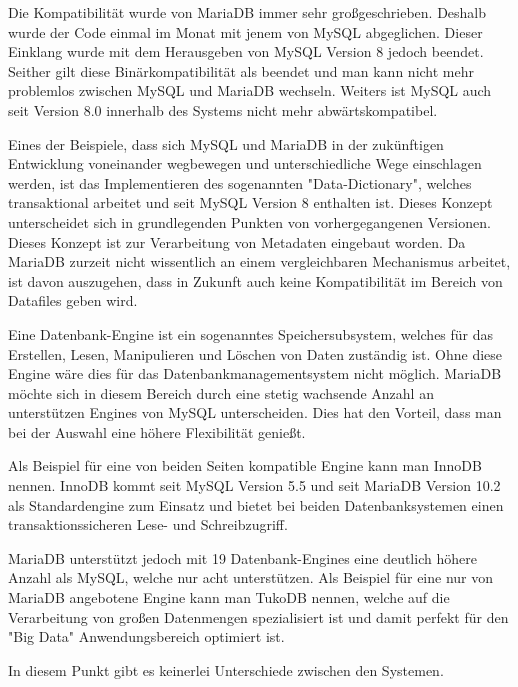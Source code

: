 Die Kompatibilität wurde von MariaDB immer sehr großgeschrieben. Deshalb wurde der Code einmal im Monat mit jenem von MySQL abgeglichen. Dieser Einklang wurde mit dem Herausgeben von MySQL Version 8 jedoch beendet. Seither gilt diese Binärkompatibilität als beendet und man kann nicht mehr problemlos zwischen MySQL und MariaDB wechseln. Weiters ist MySQL auch seit Version 8.0 innerhalb des Systems nicht mehr abwärtskompatibel. \cite{MariaVsMy}

Eines der Beispiele, dass sich MySQL und MariaDB in der zukünftigen Entwicklung voneinander wegbewegen und unterschiedliche Wege einschlagen werden, ist das Implementieren des sogenannten "Data-Dictionary", welches transaktional arbeitet und seit MySQL Version 8 enthalten ist. Dieses Konzept unterscheidet sich in grundlegenden Punkten von vorhergegangenen Versionen. Dieses Konzept ist zur  Verarbeitung von Metadaten eingebaut worden. Da MariaDB zurzeit nicht wissentlich an einem vergleichbaren Mechanismus arbeitet, ist davon auszugehen, dass in Zukunft auch keine Kompatibilität im Bereich von Datafiles geben wird. \cite{MariaVsMy}

 \label{sec:dbEngine}

Eine Datenbank-Engine ist ein sogenanntes Speichersubsystem, welches für das Erstellen, Lesen, Manipulieren und Löschen von Daten zuständig ist. Ohne diese Engine wäre dies für das Datenbankmanagementsystem nicht möglich.
MariaDB möchte sich in diesem Bereich durch eine stetig wachsende Anzahl an unterstützen Engines von MySQL unterscheiden. Dies hat den Vorteil, dass man bei der Auswahl eine höhere Flexibilität genießt. \cite{MariaVsMy}

Als Beispiel für eine von beiden Seiten kompatible Engine kann man InnoDB nennen. InnoDB kommt seit MySQL Version 5.5 und seit MariaDB Version 10.2 als Standardengine zum Einsatz und bietet bei beiden Datenbanksystemen einen transaktionssicheren Lese- und Schreibzugriff. \cite{MariaVsMy}

MariaDB unterstützt jedoch mit 19 Datenbank-Engines eine deutlich höhere Anzahl als MySQL, welche nur acht unterstützen. Als Beispiel für eine nur von MariaDB angebotene Engine kann man TukoDB nennen, welche auf die Verarbeitung von großen Datenmengen spezialisiert ist und damit perfekt für den "Big Data" Anwendungsbereich optimiert ist. \cite{MariaVsMy}


In diesem Punkt gibt es keinerlei Unterschiede zwischen den Systemen. \cite{MariaVsMy}

